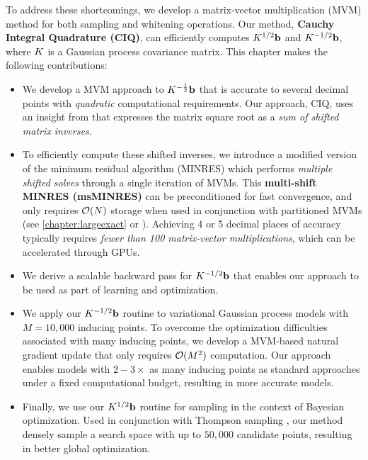 To address these shortcomings, we develop a matrix-vector multiplication (MVM) method for both sampling and whitening operations.
Our method, {\bf Cauchy Integral Quadrature (CIQ)}, can efficiently computes $K^{1/2} \mathbf{b}$ and $K^{-1/2} \mathbf{b}$, where $K$ is a Gaussian process covariance matrix.
This chapter makes the following contributions:
%
\begin{itemize}
  \item We develop a MVM approach to $K^{-\frac 1 2} \mathbf{b}$ that is accurate to several decimal points with \emph{quadratic} computational requirements.
    Our approach, CIQ, uses an insight from \citet{hale2008computing} that expresses the matrix square root as a \emph{sum of shifted matrix inverses}.

  \item To efficiently compute these shifted inverses, we introduce a modified version of the minimum residual algorithm (MINRES) \cite{paige1975solution} which performs \emph{multiple shifted solves} through a single iteration of MVMs.
    This {\bf multi-shift MINRES (msMINRES)} can be preconditioned for fast convergence, and only requires $\bigo{N}$ storage when used in conjunction with partitioned MVMs (see \cref{chapter:largeexact} or \cite{charlier2020kernel}).
    Achieving 4 or 5 decimal places of accuracy typically requires \emph{fewer than 100 matrix-vector multiplications}, which can be accelerated through GPUs.

  \item We derive a scalable backward pass for $K^{-1/2} \mathbf{b}$ that enables our approach to be used as part of learning and optimization.

  \item We apply our $K^{-1/2} \mathbf{b}$ routine to variational Gaussian process models with $M = 10,\!000$ inducing points.
    To overcome the optimization difficulties associated with many inducing points, we develop a MVM-based natural gradient update that only requires $\bigo{M^2}$ computation.
    Our approach enables models with $2-3\times$ as many inducing points as standard approaches under a fixed computational budget, resulting in more accurate models.

  \item Finally, we use our $K^{1/2} \mathbf{b}$ routine for sampling in the context of Bayesian optimization. %
    Used in conjunction with Thompson sampling \cite{thompson1933likelihood}, our method densely sample a search space with up to $50,\!000$ candidate points, resulting in better global optimization.
\end{itemize}
